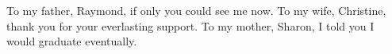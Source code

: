 \begin{dedication}
    \null\vfil
    {\large
    \begin{center}
        To my father, Raymond, if only you could see me now. To my wife, Christine, thank you for your everlasting support. To my mother, Sharon, I told you I would graduate eventually.
    \end{center}}
    \vfil\null
\end{dedication}
